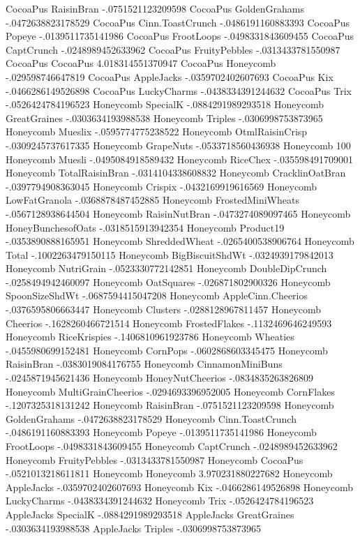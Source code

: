 CocoaPus	RaisinBran	-.0751521123209598
CocoaPus	GoldenGrahams	-.0472638823178529
CocoaPus	Cinn.ToastCrunch	-.0486191160883393
CocoaPus	Popeye	-.0139511735141986
CocoaPus	FrootLoops	-.0498331843609455
CocoaPus	CaptCrunch	-.0248989452633962
CocoaPus	FruityPebbles	-.0313433781550987
CocoaPus	CocoaPus	4.018314551370947
CocoaPus	Honeycomb	-.029598746647819
CocoaPus	AppleJacks	-.0359702402607693
CocoaPus	Kix	-.0466286149526898
CocoaPus	LuckyCharms	-.0438334391244632
CocoaPus	Trix	-.0526424784196523
Honeycomb	SpecialK	-.0884291989293518
Honeycomb	GreatGraines	-.0303634193988538
Honeycomb	Triples	-.0306998753873965
Honeycomb	Mueslix	-.0595774775238522
Honeycomb	OtmlRaisinCrisp	-.0309245737617335
Honeycomb	GrapeNuts	-.0533718560436938
Honeycomb	100%
Honeycomb	Muesli	-.0495084918589432
Honeycomb	RiceChex	-.035598491709001
Honeycomb	TotalRaisinBran	-.0314104338608832
Honeycomb	CracklinOatBran	-.0397794908363045
Honeycomb	Crispix	-.0432169919616569
Honeycomb	LowFatGranola	-.0368878487452885
Honeycomb	FrostedMiniWheats	-.0567128938644504
Honeycomb	RaisinNutBran	-.0473274089097465
Honeycomb	HoneyBunchesofOats	-.0318515913942354
Honeycomb	Product19	-.0353890888165951
Honeycomb	ShreddedWheat	-.0265400538906764
Honeycomb	Total	-.1002263479150115
Honeycomb	BigBiscuitShdWt	-.0324939179842013
Honeycomb	NutriGrain	-.0523330772142851
Honeycomb	DoubleDipCrunch	-.0258494942460097
Honeycomb	OatSquares	-.026871802900326
Honeycomb	SpoonSizeShdWt	-.0687594415047208
Honeycomb	AppleCinn.Cheerios	-.0376595806663447
Honeycomb	Clusters	-.0288128967811457
Honeycomb	Cheerios	-.1628260466721514
Honeycomb	FrostedFlakes	-.1132469646249593
Honeycomb	RiceKrispies	-.1406810961923786
Honeycomb	Wheaties	-.0455980699152481
Honeycomb	CornPops	-.0602868603345475
Honeycomb	RaisinBran	-.0383019084176755
Honeycomb	CinnamonMiniBuns	-.0245871945621436
Honeycomb	HoneyNutCheerios	-.0834835263826809
Honeycomb	MultiGrainCheerios	-.0294693396952005
Honeycomb	CornFlakes	-.1207325318131242
Honeycomb	RaisinBran	-.0751521123209598
Honeycomb	GoldenGrahams	-.0472638823178529
Honeycomb	Cinn.ToastCrunch	-.0486191160883393
Honeycomb	Popeye	-.0139511735141986
Honeycomb	FrootLoops	-.0498331843609455
Honeycomb	CaptCrunch	-.0248989452633962
Honeycomb	FruityPebbles	-.0313433781550987
Honeycomb	CocoaPus	-.0521013218611811
Honeycomb	Honeycomb	3.970231880227682
Honeycomb	AppleJacks	-.0359702402607693
Honeycomb	Kix	-.0466286149526898
Honeycomb	LuckyCharms	-.0438334391244632
Honeycomb	Trix	-.0526424784196523
AppleJacks	SpecialK	-.0884291989293518
AppleJacks	GreatGraines	-.0303634193988538
AppleJacks	Triples	-.0306998753873965
